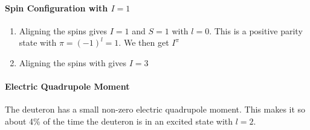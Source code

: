 \paragraph{Spin Configuration with $I = 1$}
\begin{enumerate}
    \item Aligning the spins gives $I = 1$ and $S = 1$ with $l = 0$. This is a positive parity state with $π = (-1)^{l} = 1$. We then get $I^{π}$ 
    \item Aligning the spins with gives $I = 3$
\end{enumerate}

\paragraph{Electric Quadrupole Moment}
The deuteron has a small non-zero electric quadrupole moment. This makes it so about 4\% of the time the deuteron is in an excited state with $l = 2$. 